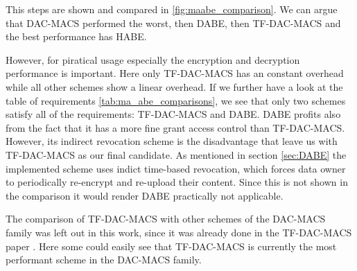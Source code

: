 This steps are shown and compared in \ref{fig:maabe_comparison}. We can argue that \ac{DAC-MACS} performed the worst, then \ac{DABE}, then \ac{TF-DAC-MACS} and the best performance has \ac{HABE}.  

However, for piratical usage especially the encryption and decryption performance is important. Here only \ac{TF-DAC-MACS} has an constant overhead while all other schemes show a linear overhead. If we further have a look at the table of requirements \ref{tab:ma_abe_comparisons}, we see that only two schemes satisfy all of the requirements: \ac{TF-DAC-MACS} and \ac{DABE}. \ac{DABE} profits also from the fact that it has a more fine grant access control than \ac{TF-DAC-MACS}. However, its indirect revocation scheme is the disadvantage that leave us with \ac{TF-DAC-MACS} as our final candidate. As mentioned in section \ref{sec:DABE} the implemented scheme uses indict time-based revocation, which forces data owner to periodically re-encrypt and re-upload their content. Since this is not shown in the comparison it would render DABE practically not applicable.

The comparison of \ac{TF-DAC-MACS} with other schemes of the \ac{DAC-MACS} family was left out in this work, since it was already done in the \ac{TF-DAC-MACS} paper \cite{li2017two}. Here some could easily see that \ac{TF-DAC-MACS} is currently the most performant scheme in the \ac{DAC-MACS} family.  